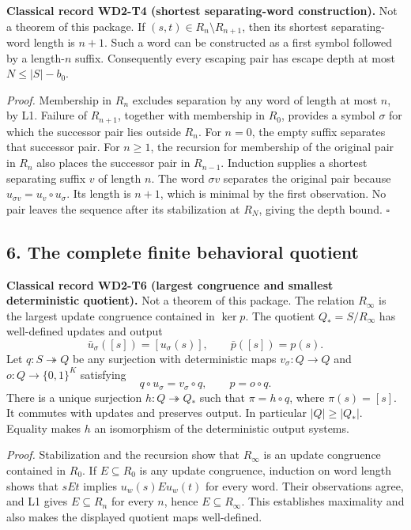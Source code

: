 \documentclass[
  11pt,
]{article}
\begin{document}
\textbf{Classical record WD2-T4 (shortest separating-word construction).} Not a theorem of this package. If
\((s,t)\in R_n\setminus R_{n+1}\), then its shortest separating-word
length is \(n+1\). Such a word can be constructed as a first symbol
followed by a length-\(n\) suffix. Consequently every escaping pair has
escape depth at most \(N\le |S|-b_0\).

\emph{Proof.} Membership in \(R_n\) excludes separation by any word of
length at most \(n\), by L1. Failure of \(R_{n+1}\), together with
membership in \(R_0\), provides a symbol \(\sigma\) for which the
successor pair lies outside \(R_n\). For \(n=0\), the empty suffix
separates that successor pair. For \(n\ge1\), the recursion for
membership of the original pair in \(R_n\) also places the successor
pair in \(R_{n-1}\). Induction supplies a shortest separating suffix
\(v\) of length \(n\). The word \(\sigma v\) separates the original pair
because \(u_{\sigma v}=u_v\circ u_\sigma\). Its length is \(n+1\), which
is minimal by the first observation. No pair leaves the sequence after
its stabilization at \(R_N\), giving the depth bound. \(\square\)

\subsection{6. The complete finite behavioral
quotient}\label{the-complete-finite-behavioral-quotient}

\textbf{Classical record WD2-T6 (largest congruence and smallest deterministic quotient).} Not a theorem of this package.
The relation \(R_\infty\) is the largest update congruence
contained in \(\ker p\). The quotient \(Q_*=S/R_\infty\) has
well-defined updates and output \[
 \bar u_\sigma([s])=[u_\sigma(s)],\qquad \bar p([s])=p(s).
\] Let \(q:S\twoheadrightarrow Q\) be any surjection with deterministic
maps \(v_\sigma:Q\to Q\) and \(o:Q\to\{0,1\}^K\) satisfying \[
 q\circ u_\sigma=v_\sigma\circ q,\qquad p=o\circ q.
\] There is a unique surjection \(h:Q\twoheadrightarrow Q_*\) such that
\(\pi=h\circ q\), where \(\pi(s)=[s]\). It commutes with updates and
preserves output. In particular \(|Q|\ge|Q_*|\). Equality makes \(h\) an
isomorphism of the deterministic output systems.

\emph{Proof.} Stabilization and the recursion show that \(R_\infty\) is
an update congruence contained in \(R_0\). If \(E\subseteq R_0\) is any
update congruence, induction on word length shows that \(sEt\) implies
\(u_w(s)E u_w(t)\) for every word. Their observations agree, and L1
gives \(E\subseteq R_n\) for every \(n\), hence \(E\subseteq R_\infty\).
This establishes maximality and also makes the displayed quotient maps
well-defined.
\end{document}
